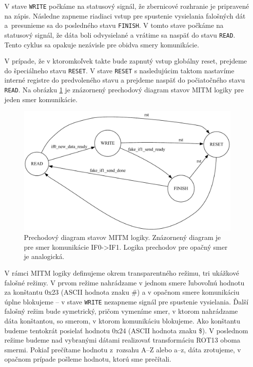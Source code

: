 V stave \texttt{WRITE} počkáme na statusový signál, že zbernicové rozhranie je pripravené na zápis. Následne zapneme riadiaci vstup pre spustenie vysielania falošných dát a~presunieme sa do posledného stavu \texttt{FINISH}. V tomto stave počkáme na statusový signál, že dáta boli odvysielané a vrátime sa naspäť do stavu \texttt{READ}. Tento cyklus sa opakuje nezávisle pre obidva smery komunikácie.

V prípade, že v ktoromkoľvek takte bude zapnutý vstup globálny reset, prejdeme do špeciálneho stavu \texttt{RESET}. V stave \texttt{RESET} s nasledujúcim taktom nastavíme interné registre do predvoleného stavu a prejdeme naspäť do počiatočného stavu \texttt{READ}. Na obrázku \ref{obr:mitmStateTransition} je znázornený prechodový diagram stavov MITM logiky pre jeden smer komunikácie.

\begin{figure}
    \centerline{\includegraphics[width=1\textwidth]{images/misc/mitmStateTransition.pdf}}
    \caption[Prechodový diagram stavov MITM logiky]{Prechodový diagram stavov MITM logiky. Znázornený diagram je pre smer komunikácie IF0->IF1. Logika prechodov pre opačný smer je analogická.}
    \label{obr:mitmStateTransition}
\end{figure}

V rámci MITM logiky definujeme okrem transparentného režimu, tri ukážkové falošné režimy. V prvom režime nahrádzame v jednom smere ľubovoľnú hodnotu za konštantu 0x23 (ASCII hodnota znaku \#) a v opačnom smere komunikáciu úplne blokujeme -- v stave \texttt{WRITE} nezapneme signál pre spustenie vysielania. Ďalší falošný režim bude symetrický, pričom vymeníme smer, v ktorom nahrádzame dáta konštantou, so smerom, v ktorom komunikáciu blokujeme. Ako konštantu budeme tentokrát posielať hodnotu 0x24 (ASCII hodnota znaku \$). V poslednom režime budeme nad vybranými dátami realizovať transformáciu ROT13 oboma smermi. Pokiaľ prečítame hodnotu z~rozsahu A--Z alebo a--z, dáta zrotujeme, v opačnom prípade pošleme hodnotu, ktorú sme prečítali.

